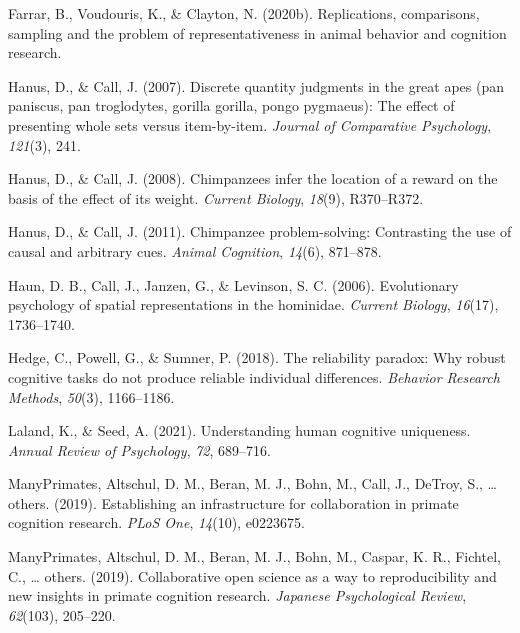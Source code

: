 \documentclass[10pt, letterpaper]{article}
\begin{document}
\leavevmode\hypertarget{ref-farrar2020replications}{}%
Farrar, B., Voudouris, K., \& Clayton, N. (2020b). Replications,
comparisons, sampling and the problem of representativeness in animal
behavior and cognition research.

\leavevmode\hypertarget{ref-hanus2007discrete}{}%
Hanus, D., \& Call, J. (2007). Discrete quantity judgments in the great
apes (pan paniscus, pan troglodytes, gorilla gorilla, pongo pygmaeus):
The effect of presenting whole sets versus item-by-item. \emph{Journal
of Comparative Psychology}, \emph{121}(3), 241.

\leavevmode\hypertarget{ref-hanus2008chimpanzees}{}%
Hanus, D., \& Call, J. (2008). Chimpanzees infer the location of a
reward on the basis of the effect of its weight. \emph{Current Biology},
\emph{18}(9), R370--R372.

\leavevmode\hypertarget{ref-hanus2011chimpanzee}{}%
Hanus, D., \& Call, J. (2011). Chimpanzee problem-solving: Contrasting
the use of causal and arbitrary cues. \emph{Animal Cognition},
\emph{14}(6), 871--878.

\leavevmode\hypertarget{ref-haun2006evolutionary}{}%
Haun, D. B., Call, J., Janzen, G., \& Levinson, S. C. (2006).
Evolutionary psychology of spatial representations in the hominidae.
\emph{Current Biology}, \emph{16}(17), 1736--1740.

\leavevmode\hypertarget{ref-hedge2018reliability}{}%
Hedge, C., Powell, G., \& Sumner, P. (2018). The reliability paradox:
Why robust cognitive tasks do not produce reliable individual
differences. \emph{Behavior Research Methods}, \emph{50}(3), 1166--1186.

\leavevmode\hypertarget{ref-laland2021understanding}{}%
Laland, K., \& Seed, A. (2021). Understanding human cognitive
uniqueness. \emph{Annual Review of Psychology}, \emph{72}, 689--716.

\leavevmode\hypertarget{ref-many2019establishing}{}%
ManyPrimates, Altschul, D. M., Beran, M. J., Bohn, M., Call, J., DeTroy,
S., \ldots{} others. (2019). Establishing an infrastructure for
collaboration in primate cognition research. \emph{PLoS One},
\emph{14}(10), e0223675.

\leavevmode\hypertarget{ref-primates2019collaborative}{}%
ManyPrimates, Altschul, D. M., Beran, M. J., Bohn, M., Caspar, K. R.,
Fichtel, C., \ldots{} others. (2019). Collaborative open science as a
way to reproducibility and new insights in primate cognition research.
\emph{Japanese Psychological Review}, \emph{62}(103), 205--220.
\end{document}
